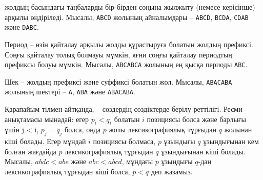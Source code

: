 

 жолдың басындағы таңбаларды бір-бірден соңына 
жылжыту (немесе керісінше) арқылы өңдіріледі. 
Мысалы, \texttt{ABCD} жолының айналымдары -- 
\texttt{ABCD}, \texttt{BCDA}, \texttt{CDAB} және \texttt{DABC}.



Период -- өзін қайталау арқылы жолды құрастыруға болатын
жолдың префиксі. Соңғы қайталау толық болмауы мүмкін,
яғни соңғы қайталау периодтың префиксы болуы мүмкін. 
Мысалы, \texttt{ABCABCA} жолының ең қысқа периоды \texttt{ABC}.



Шек -- жолдың префиксі және суффиксі болатын
жол. Мысалы, \texttt{ABACABA} жолының шектері --
\texttt{A}, \texttt{ABA} және \texttt{ABACABA}.



Қарапайым тілмен айтқанда,  -- сөздердің сөздіктерде берілу реттілігі. Ресми анықтамасы мынадай: егер $p_i < q_i$ болатын $i$ позициясы болса және барлығы үшін j < i, $p_j = q_j$ болса, онда $p$ жолы лексикографиялық тұрғыдан $q$ жолынан кіші болады. Егер мұндай $i$ позициясы болмаса, $p$ ұзындығы $q$ ұзындығынан кем болған жағдайда $p$ лексикографиялық тұрғыдан $q$ ұзындығынан кіші болады. Мысалы, $abdc < abe$ және $abc < abcd$, мұндағы $p$ ұзындығы $q$-дан лексикографиялық тұрғыдан кіші болса, $p < q$ деп жазамыз.

